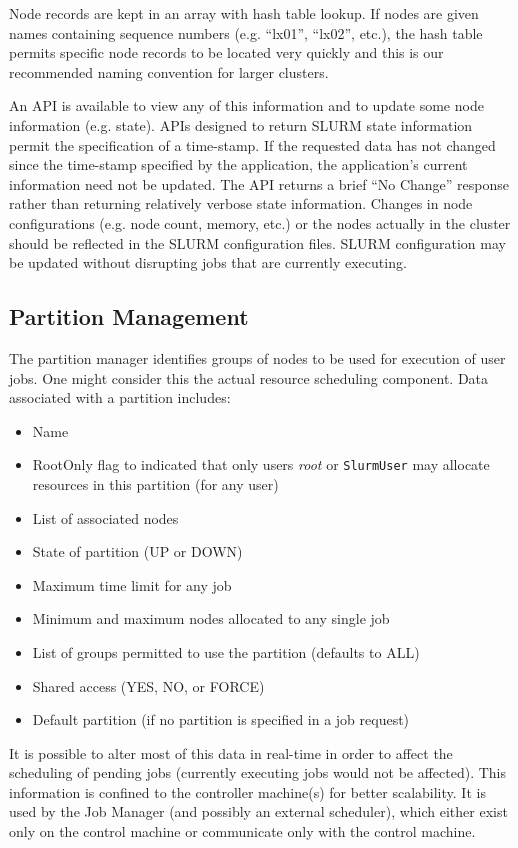 \documentclass[10pt,onecolumn,times]{../common/llncs}
\begin{document}
{Node records are kept in an array with hash table lookup.  If nodes are
given names containing sequence numbers (e.g. ``lx01'', ``lx02'', etc.),
the hash table permits specific node records to be located very quickly
and this is our recommended naming convention for larger clusters.

An API is available to view any of this information and to update some
node information (e.g. state). APIs designed to return SLURM state
information permit the specification of a time-stamp.  If the requested
data has not changed since the time-stamp specified by the application,
the application's current information need not be updated.  The API
returns a brief ``No Change'' response rather than returning relatively
verbose state information.  Changes in node configurations (e.g. node
count, memory, etc.) or the nodes actually in the cluster should be
reflected in the SLURM configuration files. SLURM configuration may be
updated without disrupting jobs that are currently executing.

\subsection{Partition Management}

The partition manager identifies groups of nodes to be used for execution
of user jobs. One might consider this the actual resource scheduling
component.  Data associated with a partition includes:

\begin{itemize}
\item Name
\item RootOnly flag to indicated that only users {\em root} or 
{\tt SlurmUser} may allocate resources in this partition (for any user)
\item List of associated nodes
\item State of partition (UP or DOWN)
\item Maximum time limit for any job
\item Minimum and maximum nodes allocated to any single job
\item List of groups permitted to use the partition (defaults to ALL)
\item Shared access (YES, NO, or FORCE)
\item Default partition (if no partition is specified in a job request)
\end{itemize}

It is possible to alter most of this data in real-time in order to affect
the scheduling of pending jobs (currently executing jobs would not be
affected).  This information is confined to the controller machine(s)
for better scalability.  It is used by the Job Manager (and possibly an
external scheduler), which either exist only on the control machine or
communicate only with the control machine.

}
\end{document}
